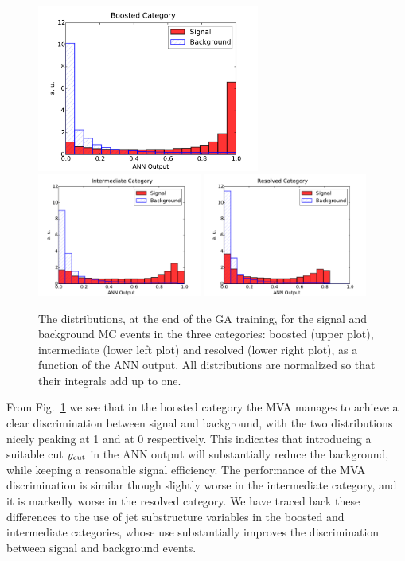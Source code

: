 \begin{figure}[t]
\begin{center}
\includegraphics[width=0.65\textwidth]{plots/Boosted_disc_noPU.pdf}
\includegraphics[width=0.48\textwidth]{plots/Intermediate_disc_noPU.pdf}
\includegraphics[width=0.48\textwidth]{plots/Resolved_disc_noPU.pdf}
\caption{\small The distributions, at the end of the
  GA training, 
  for the signal and background MC events in the three categories:
  boosted (upper plot), intermediate (lower left plot) and
  resolved (lower right plot), as a function of the ANN output.
  All distributions are normalized so that their integrals
  add up to one.
}
\label{fig:nnresponse}
\end{center}
\end{figure}

From Fig.~\ref{fig:nnresponse} we see that in the boosted category the MVA manages
to achieve a clear discrimination between signal and background, with the two distributions
nicely peaking at 1 and at 0 respectively.
%
This indicates that introducing a suitable cut
$y_{\rm cut}$
in the ANN output will substantially reduce the background,
while keeping a reasonable signal efficiency.
%
The performance of the MVA discrimination is similar though slightly worse in the intermediate
category, and it is markedly worse in the resolved category.
%
We have traced back these differences to the use of jet substructure variables
in the boosted and intermediate categories, whose use substantially
improves the
discrimination between signal and background events.

